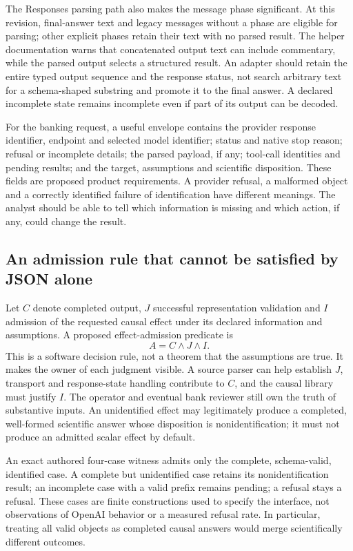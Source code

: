 The Responses parsing path also makes the message phase significant. At this revision, final-answer text and
legacy messages without a phase are eligible for parsing; other explicit phases retain their text with no parsed
result. The helper documentation warns that concatenated output text can include commentary, while the parsed
output selects a structured result. An adapter should retain the entire typed output sequence and the response
status, not search arbitrary text for a schema-shaped substring and promote it to the final answer. A declared
incomplete state remains incomplete even if part of its output can be decoded.~\citep{exec28_oa_sdk}

For the banking request, a useful envelope contains the provider response identifier, endpoint and selected
model identifier; status and native stop reason; refusal or incomplete details; the parsed payload, if any;
tool-call identities and pending results; and the target, assumptions and scientific disposition. These fields
are proposed product requirements. A provider refusal, a malformed object and a correctly identified failure
of identification have different meanings. The analyst should be able to tell which information is missing
and which action, if any, could change the result.

\subsection{An admission rule that cannot be satisfied by JSON alone}
Let \(C\) denote completed output, \(J\) successful representation validation and \(I\) admission of the
requested causal effect under its declared information and assumptions. A proposed effect-admission predicate is
\[
 A=C\land J\land I.
\]
This is a software decision rule, not a theorem that the assumptions are true. It makes the owner of each
judgment visible. A source parser can help establish \(J\), transport and response-state handling contribute to
\(C\), and the causal library must justify \(I\). The operator and eventual bank reviewer still own the truth
of substantive inputs. An unidentified effect may legitimately produce a completed, well-formed scientific
answer whose disposition is nonidentification; it must not produce an admitted scalar effect by default.

An exact authored four-case witness admits only the complete, schema-valid, identified case. A complete but
unidentified case retains its nonidentification result; an incomplete case with a valid prefix remains pending;
a refusal stays a refusal. These cases are finite constructions used to specify the interface, not observations
of OpenAI behavior or a measured refusal rate. In particular, treating all valid objects as completed causal
answers would merge scientifically different outcomes.~\citep{exec28_oa_reference}

